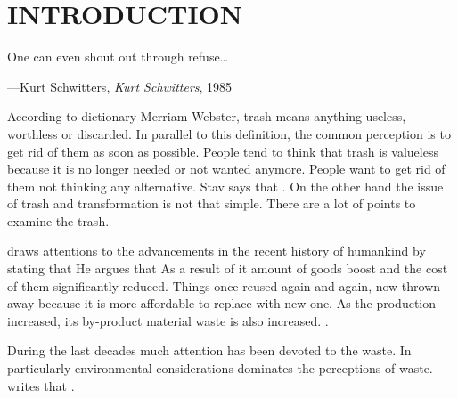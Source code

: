 \chapter{INTRODUCTION}



\begin{singlespace}
\epigraph{One can even shout out through refuse\ldots}{\hfill---Kurt Schwitters, \textit{Kurt Schwitters}, 1985}
\end{singlespace}



According to dictionary Merriam-Webster, trash means anything useless, worthless or discarded. In parallel to this definition, the common perception is to get rid of them as soon as possible. People tend to think that trash is valueless because it is no longer needed or not wanted anymore. People want to get rid of them not thinking any alternative. Stav says that  \citep[as cited in][]{navarro2015followingtrash}. On the other hand the issue of trash and transformation is not that simple. There are a lot of points to examine the trash.

\citet[11]{banash2013collage} draws attentions to the advancements in the recent history of humankind by stating that  He argues that  As a result of it amount of goods boost and the cost of them significantly reduced. Things once reused again and again, now thrown away because it is more affordable to replace with new one. As the production increased, its by-product material waste is also increased.  \citep[ix]{pye2010trashculture}.

During the last decades much attention has been devoted to the waste. In particularly environmental considerations dominates the perceptions of waste. \citet[41]{ibarra2015beautiful} writes that .

